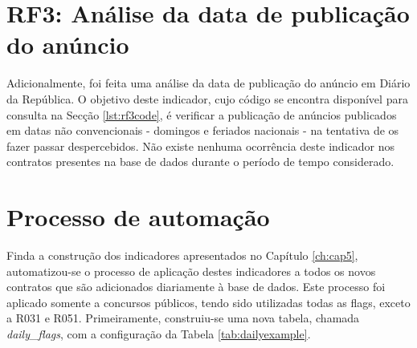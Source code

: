 \section{RF3: Análise da data de publicação do anúncio}

Adicionalmente, foi feita uma análise da data de publicação do anúncio em Diário da República. O objetivo deste indicador, cujo código se encontra disponível para consulta na Secção \ref{lst:rf3code}, é verificar a publicação de anúncios publicados em datas não convencionais - domingos e feriados nacionais - na tentativa de os fazer passar despercebidos. Não existe nenhuma ocorrência deste indicador nos contratos presentes na base de dados durante o período de tempo considerado. 



\section{Processo de automação}

Finda a construção dos indicadores apresentados no Capítulo \ref{ch:cap5}, automatizou-se o processo de aplicação destes indicadores a todos os novos contratos que são adicionados diariamente à base de dados. Este processo foi aplicado somente a concursos públicos, tendo sido utilizadas todas as flags, exceto a R031 e R051. Primeiramente, construiu-se uma nova tabela, chamada \textit{daily\_flags}, com a configuração da Tabela \ref{tab:dailyexample}. 


\begin{table}[H]
	\centering
	\renewcommand{\arraystretch}{1.15}
	\setlength{\tabcolsep}{15pt}
	\caption{Exemplo de aplicação de todos os indicadores binários a um concurso público.}
	\label{tab:dailyexample}
\end{table}

